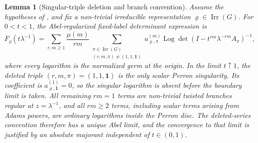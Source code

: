 \documentclass[11pt,a4paper]{amsart}
\theoremstyle{plain}
\newtheorem{lemma}[theorem]{Lemma}
\theoremstyle{definition}
\theoremstyle{remark}
\DeclareMathOperator{\Irr}{Irr}
\DeclareMathOperator{\Log}{Log}
\begin{document}
\begin{lemma}[Singular-triple deletion and branch convention]
  \label{lem:fixed-label-singular-triple-deletion}
  Assume the hypotheses of , and fix a
  non-trivial irreducible representation \(\varrho\in\Irr(G)\).  For
  \(0<t<1\), the Abel-regularized fixed-label determinant expression is
  \begin{equation}\label{eq:fixed-label-singular-deletion-abel}
    F_\varrho(t\lambda^{-1})
    =
    \sum_{r,m\ge1}\frac{\mu(m)}{rm}
      \sum_{\substack{\pi\in\Irr(G)\\(r,m,\pi)\neq(1,1,\mathbf1)}}
        a_{\varrho,\pi}^{(m)}
        \Log\det(I-t^{rm}\lambda^{-rm}A_\pi)^{-1},
  \end{equation}
  where every logarithm is the normalized germ at the origin.  In the limit
  \(t\uparrow1\), the deleted triple \((r,m,\pi)=(1,1,\mathbf1)\) is the
  only scalar Perron singularity. Its coefficient is
  \(a_{\varrho,\mathbf1}^{(1)}=0\), so the singular logarithm is absent
  before the boundary limit is taken.  All remaining \(rm=1\) terms are
  non-trivial twisted branches regular at \(z=\lambda^{-1}\), and all
  \(rm\ge2\) terms, including scalar terms arising from Adams powers, are
  ordinary logarithms inside the Perron disc.  The deleted-series convention
  therefore has a unique Abel limit, and the convergence to that limit is
  justified by an absolute majorant independent of \(t\in(0,1)\).
\end{lemma}
\end{document}
